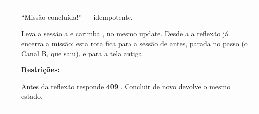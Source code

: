 \begin{tabularx}{\linewidth}{@{}L{40mm}L{24mm}X@{}}
\toprule
\headrow {} &  & \\
\midrule
\endhead
{} &  & \enquote{Missão concluída!} --- idempotente.\par Leva a sessão a  e carimba , no mesmo update. Desde a  a reflexão já encerra a missão: esta rota fica para a sessão de antes, parada no passo  (o Canal B, que saiu), e para a tela antiga.\par \textbf{Restrições:}\par \hspace*{1em}\textbullet{} Antes da reflexão responde \textbf{409} . Concluir de novo devolve o mesmo estado.\\

\end{tabularx}
